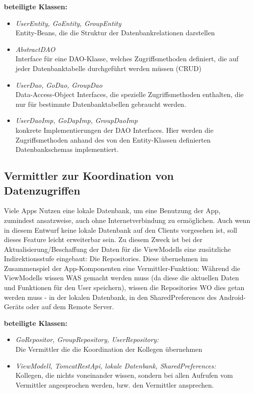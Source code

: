 \documentclass[11pt,a4paper]{article}
\begin{document}
\textbf{beteiligte Klassen:}
\begin{itemize}
	\item \textit{UserEntity, GoEntity, GroupEntity}\\ Entity-Beans, die die Struktur der Datenbankrelationen darstellen
	\item \textit{AbstractDAO}\\ Interface für eine DAO-Klasse, welches Zugriffsmethoden definiert, die auf jeder Datenbanktabelle durchgeführt werden müssen (CRUD)
	\item \textit{UserDao, GoDao, GroupDao}\\ Data-Access-Object Interfaces, die spezielle Zugriffsmethoden enthalten, die nur für bestimmte Datenbanktabellen gebraucht werden.
	\item \textit{UserDaoImp, GoDapImp, GroupDaoImp}\\ konkrete Implementierungen der DAO Interfaces. Hier werden die Zugriffsmethoden anhand des von den Entity-Klassen definierten Datenbankschemas
	implementiert.
\end{itemize}

\subsection{Vermittler zur Koordination von Datenzugriffen}\label{Vermittler}
Viele Apps Nutzen eine lokale Datenbank, um eine Benutzung der App, zumindest ansatzweise, auch ohne Internetverbindung zu ermöglichen. Auch wenn in diesem Entwurf keine lokale Datenbank auf den Clients vorgesehen ist, soll dieses Feature leicht erweiterbar sein. Zu diesem Zweck ist bei der Aktualisierung/Beschaffung der Daten für die ViewModells eine zusätzliche Indirektionsstufe eingebaut: Die Repositories. Diese übernehmen im Zusammenspiel der App-Komponenten eine Vermittler-Funktion: Während die ViewModells wissen WAS gemacht werden muss (da diese die aktuellen Daten und Funktionen für den User speichern), wissen die Repositories WO dies getan werden muss - in der lokalen Datenbank, in den SharedPreferences des Android-Geräts oder auf dem Remote Server.

\textbf{beteiligte Klassen:}
\begin{itemize}
	\item \textit{GoRepositor, GroupRepository, UserRepository:}\\
	 Die Vermittler die die Koordination der Kollegen übernehmen
	\item \textit{ViewModell, TomcatRestApi, lokale Datenbank, SharedPreferences:}\\ Kollegen, die nichts voneinander wissen, sondern bei allen Aufrufen vom Vermittler angesprochen werden, bzw. den Vermittler ansprechen.
\end{itemize}
\end{document}
